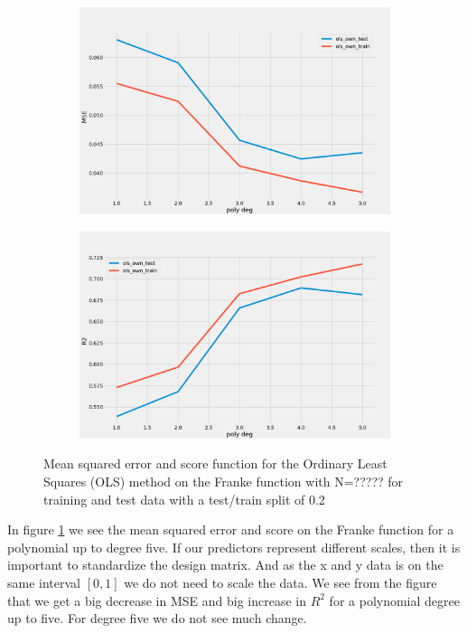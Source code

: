 \begin{figure}
     \centering
     \begin{subfigure}[b]{0.5\textwidth}
         \centering
         \includegraphics[width=\textwidth]{Figures/b_mse.png}
     \end{subfigure}%
     \hfill
     \begin{subfigure}[b]{0.5\textwidth}
         \centering
         \includegraphics[width=\textwidth]{Figures/b_r2.png}
     \end{subfigure}
        \caption{Mean squared error and score function for the Ordinary Least Squares (OLS) method on the Franke function with N=????? for training and test data with a test/train split of 0.2}
        \label{fig:mse_and_score_franke}
\end{figure}

In figure \ref{fig:mse_and_score_franke} we see the mean squared error and score on the Franke function for a polynomial up to degree five. If our predictors represent different scales, then it is important to standardize the design matrix. And as the x and y data is on the same interval $[0, 1]$ we do not need to scale the data. We see from the figure that we get a big decrease in MSE and big increase in $R^2$ for a polynomial degree up to five. For degree five we do not see much change. 

